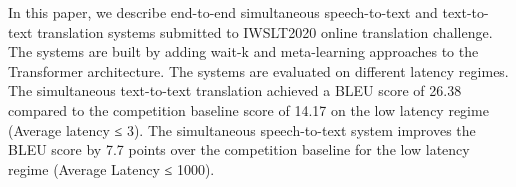 In this paper, we describe end-to-end simultaneous speech-to-text and text-to-text translation systems submitted to IWSLT2020 online translation challenge. The systems are built by adding wait-k and meta-learning approaches to the Transformer architecture. The systems are evaluated on different latency regimes. The simultaneous text-to-text translation achieved a BLEU score of  26.38 compared to the competition baseline score of 14.17  on the low latency regime (Average latency ≤ 3). The simultaneous speech-to-text system improves the BLEU score by 7.7 points over the competition baseline for the low latency regime (Average Latency ≤ 1000).
